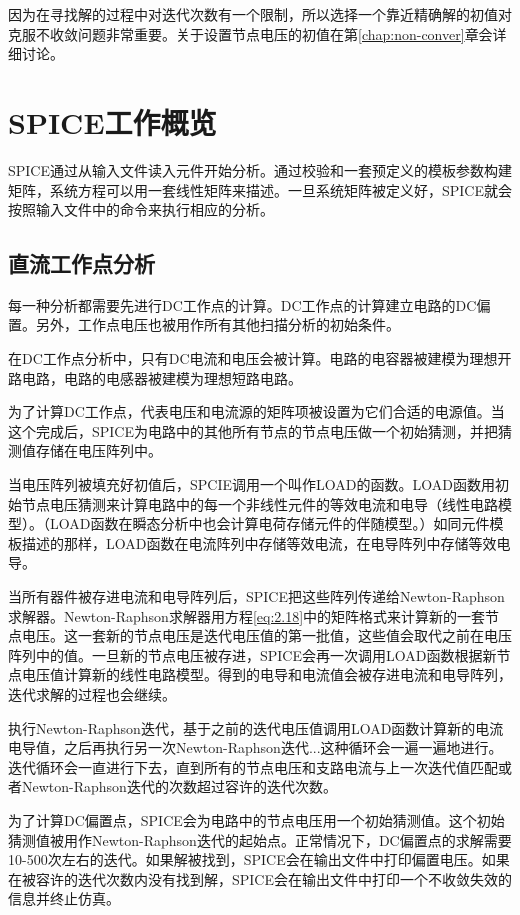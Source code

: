 因为在寻找解的过程中对迭代次数有一个限制，所以选择一个靠近精确解的初值对克服不收敛问题非常重要。关于设置节点电压的初值在第\ref{chap:non-conver}章会详细讨论。

\section{SPICE工作概览}
SPICE通过从输入文件读入元件开始分析。通过校验和一套预定义的模板参数构建矩阵，系统方程可以用一套线性矩阵来描述。一旦系统矩阵被定义好，SPICE就会按照输入文件中的命令来执行相应的分析。

\subsection{直流工作点分析}
每一种分析都需要先进行DC工作点的计算。DC工作点的计算建立电路的DC偏置。另外，工作点电压也被用作所有其他扫描分析的初始条件。

在DC工作点分析中，只有DC电流和电压会被计算。电路的电容器被建模为理想开路电路，电路的电感器被建模为理想短路电路。

为了计算DC工作点，代表电压和电流源的矩阵项被设置为它们合适的电源值。当这个完成后，SPICE为电路中的其他所有节点的节点电压做一个初始猜测，并把猜测值存储在电压阵列中。

当电压阵列被填充好初值后，SPCIE调用一个叫作LOAD的函数。LOAD函数用初始节点电压猜测来计算电路中的每一个非线性元件的等效电流和电导（线性电路模型）。（LOAD函数在瞬态分析中也会计算电荷存储元件的伴随模型。）如同元件模板描述的那样，LOAD函数在电流阵列中存储等效电流，在电导阵列中存储等效电导。

当所有器件被存进电流和电导阵列后，SPICE把这些阵列传递给Newton-Raphson求解器。Newton-Raphson求解器用方程\ref{eq:2.18}中的矩阵格式来计算新的一套节点电压。这一套新的节点电压是迭代电压值的第一批值，这些值会取代之前在电压阵列中的值。一旦新的节点电压被存进，SPICE会再一次调用LOAD函数根据新节点电压值计算新的线性电路模型。得到的电导和电流值会被存进电流和电导阵列，迭代求解的过程也会继续。

执行Newton-Raphson迭代，基于之前的迭代电压值调用LOAD函数计算新的电流电导值，之后再执行另一次Newton-Raphson迭代...这种循环会一遍一遍地进行。迭代循环会一直进行下去，直到所有的节点电压和支路电流与上一次迭代值匹配或者Newton-Raphson迭代的次数超过容许的迭代次数。

为了计算DC偏置点，SPICE会为电路中的节点电压用一个初始猜测值。这个初始猜测值被用作Newton-Raphson迭代的起始点。正常情况下，DC偏置点的求解需要10-500次左右的迭代。如果解被找到，SPICE会在输出文件中打印偏置电压。如果在被容许的迭代次数内没有找到解，SPICE会在输出文件中打印一个不收敛失效的信息并终止仿真。

